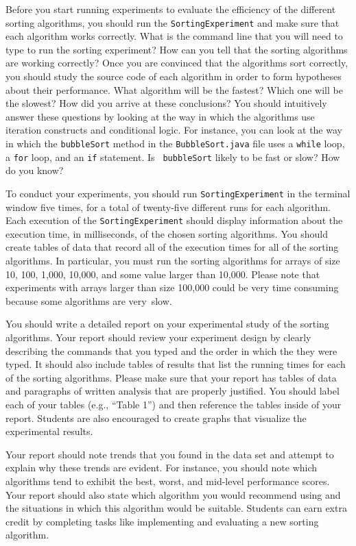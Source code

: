 Before you start running experiments to evaluate the efficiency of the different sorting algorithms, you should run the
{\tt SortingExperiment} and make sure that each algorithm works correctly.  What is the command line that you will need
to type to run the sorting experiment? How can you tell that the sorting algorithms are working correctly? Once you are
convinced that the algorithms sort correctly, you should study the source code of each algorithm in order to form 
hypotheses about their performance.  What algorithm will be the fastest? Which one will be the slowest? How did you
arrive at these conclusions? You should intuitively answer these questions by looking at the way in which the algorithms
use iteration constructs and conditional logic. For instance, you can look at the way in which the {\tt bubbleSort}
method in the {\tt BubbleSort.java} file uses a {\tt while} loop, a {\tt for} loop, and an {\tt if} statement. Is {\tt
  bubbleSort} likely to be fast or slow? How do you know?  

To conduct your experiments, you should run {\tt SortingExperiment} in the terminal window five times, for a total of
twenty-five different runs for each algorithm. Each execution of the {\tt SortingExperiment} should display information
about the execution time, in milliseconds, of the chosen sorting algorithms. You should create tables of data that
record all of the execution times for all of the sorting algorithms. In particular, you must run the sorting algorithms
for arrays of size 10, 100, 1,000, 10,000, and some value larger than 10,000. Please note that experiments 
with arrays larger than size 100,000 could be very time consuming because some algorithms are \mbox{very slow}.

You should write a detailed report on your experimental study of the sorting algorithms.  Your report should review your
experiment design by clearly describing the commands that you typed and the order in which the they were typed.  It
should also include tables of results that list the running times for each of the sorting algorithms.  Please make sure
that your report has tables of data and paragraphs of written analysis that are properly justified.  You should label
each of your tables (e.g., ``Table 1'') and then reference the tables inside of your report.  Students are also
encouraged to create graphs that visualize the experimental results.  

Your report should note trends that you found in the data set and attempt to explain why these trends are evident.  For
instance, you should note which algorithms tend to exhibit the best, worst, and mid-level performance scores.  Your
report should also state which algorithm you would recommend using and the situations in which this algorithm would be
suitable. Students can earn extra credit by completing tasks like implementing and evaluating a new sorting algorithm.

